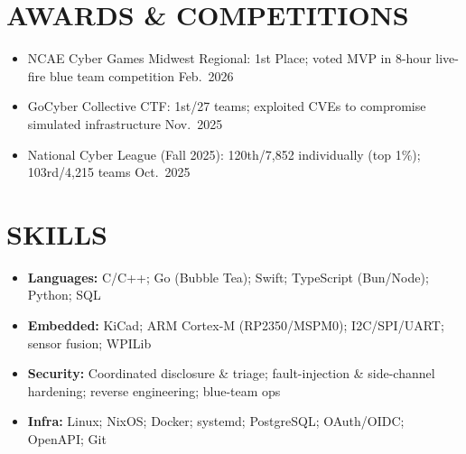 \documentclass[a4paper,10pt]{article}
\begin{document}
\section{AWARDS \& COMPETITIONS}
\begin{itemize}[nosep,leftmargin=1em,itemsep=1pt,label=--]
  \item NCAE Cyber Games Midwest Regional: 1st Place; voted MVP in 8-hour live-fire blue team competition \hfill Feb.\ 2026
  \item GoCyber Collective CTF: 1st/27 teams; exploited CVEs to compromise simulated infrastructure \hfill Nov.\ 2025
  \item National Cyber League (Fall 2025): 120th/7{,}852 individually (top 1\%); 103rd/4{,}215 teams \hfill Oct.\ 2025
\end{itemize}

\section{SKILLS}
\begin{itemize}[nosep,leftmargin=1em,itemsep=1pt,label=--]
  \item \textbf{Languages:} C/C++; Go (Bubble Tea); Swift; TypeScript (Bun/Node); Python; SQL
  \item \textbf{Embedded:} KiCad; ARM Cortex-M (RP2350/MSPM0); I2C/SPI/UART; sensor fusion; WPILib
  \item \textbf{Security:} Coordinated disclosure \& triage; fault-injection \& side-channel hardening; reverse engineering; blue-team ops
  \item \textbf{Infra:} Linux; NixOS; Docker; systemd; PostgreSQL; OAuth/OIDC; OpenAPI; Git
\end{itemize}
\end{document}
